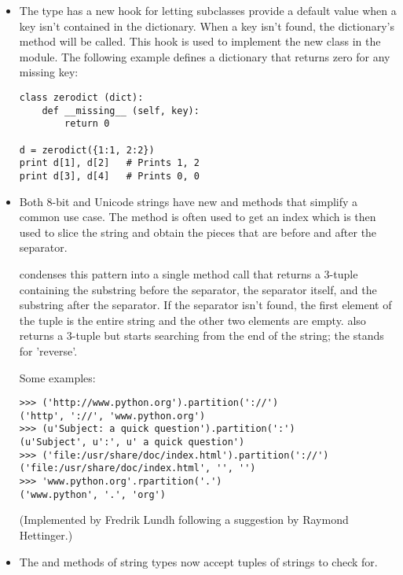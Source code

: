 \documentclass{howto}
\begin{document}
\begin{itemize}

\item The  type has a new hook for letting subclasses
provide a default value when a key isn't contained in the dictionary.
When a key isn't found, the dictionary's
method will be called.  This hook is used to implement
the new  class in the 
module.  The following example defines a dictionary 
that returns zero for any missing key:

\begin{verbatim}
class zerodict (dict):
    def __missing__ (self, key):
        return 0

d = zerodict({1:1, 2:2})
print d[1], d[2]   # Prints 1, 2
print d[3], d[4]   # Prints 0, 0
\end{verbatim}

\item Both 8-bit and Unicode strings have new  
and  methods that simplify a common use case.
The  method is often used to get an index which is
then used to slice the string and obtain the pieces that are before
and after the separator.  

 condenses this
pattern into a single method call that returns a 3-tuple containing
the substring before the separator, the separator itself, and the
substring after the separator.  If the separator isn't found, the
first element of the tuple is the entire string and the other two
elements are empty.   also returns a 3-tuple
but starts searching from the end of the string; the  stands
for 'reverse'.

Some examples:

\begin{verbatim}
>>> ('http://www.python.org').partition('://')
('http', '://', 'www.python.org')
>>> (u'Subject: a quick question').partition(':')
(u'Subject', u':', u' a quick question')
>>> ('file:/usr/share/doc/index.html').partition('://')
('file:/usr/share/doc/index.html', '', '')
>>> 'www.python.org'.rpartition('.')
('www.python', '.', 'org')
\end{verbatim}

(Implemented by Fredrik Lundh following a suggestion by Raymond Hettinger.)

\item The  and  methods
of string types now accept tuples of strings to check for.


\end{itemize}
\end{document}
